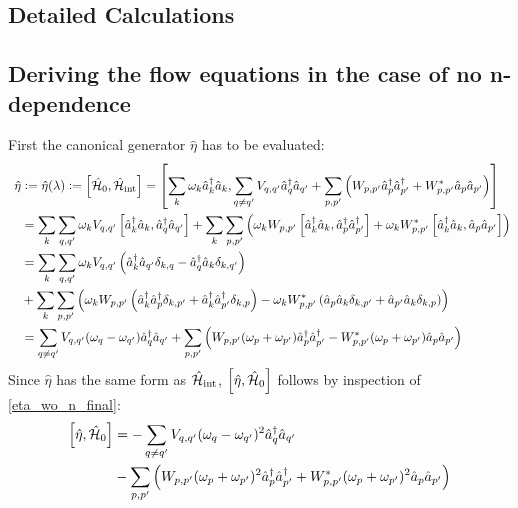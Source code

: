 \begin{appendix}

\chapter{Detailed Calculations}\label{Detailed Calculations}
\thispagestyle{empty}

\section{Deriving the flow equations in the case of no n-dependence}\label{Deriving the flow equations in the case of no n-dependence}
First the canonical generator $\hat\eta$ has to be evaluated:
\begin{align}
\hat\eta&\vcentcolon=\hat\eta(\lambda)\vcentcolon=\left[\hat{\mathcal{H}}_0,\hat{\mathcal{H}}_{\mathrm{int}}\right] = \left[\sum\limits_k \omega_k \hat a^\dagger_k\hat a_k,\sum\limits_{q\neq q^\prime}V_{q,q^\prime}\hat a^\dagger_q\hat a_{q^\prime}+\sum\limits_{p,p^\prime}\left(W_{p,p^\prime}\hat a^\dagger_p\hat a^\dagger_{p^\prime}+W_{p,p^\prime}^*\hat a_p\hat a_{p^\prime}\right)\right]  \\ \quad& 
= \sum\limits_k\sum\limits_{q,q^\prime}\omega_kV_{q,q^\prime}\left[\hat a^\dagger_k\hat a_k,\hat a^\dagger_q\hat a_{q^\prime}\right]+\sum\limits_k\sum\limits_{p,p^\prime}\left(\omega_k W_{p,p^\prime}\left[\hat a^\dagger_k\hat a_k,\hat a^\dagger_p\hat a^\dagger_{p^\prime}\right]+\omega_k W_{p,p^\prime}^*\left[\hat a^\dagger_k\hat a_k,\hat a_p\hat a_{p^\prime}\right]\right) \nonumber \\ \quad& 
=\sum\limits_k\sum\limits_{q,q^\prime}\omega_kV_{q,q^\prime}\left(\hat a^\dagger_k\hat a_{q^\prime}\delta_{k,q}-\hat a^\dagger_q\hat a_k\delta_{k,q^\prime}\right) \nonumber \\ \quad& +\sum\limits_k\sum\limits_{p,p^\prime}\left(\omega_k W_{p,p^\prime}\left(\hat a^\dagger_k\hat a^\dagger_p\delta_{k,p^\prime}+\hat a^\dagger_k\hat a^\dagger_{p^\prime}\delta_{k,p}\right)-\omega_k W_{p,p^\prime}^*\left(\hat a_p\hat a_k\delta_{k,p^\prime}+\hat a_{p^\prime}\hat a_k\delta_{k,p}\right)\right) \nonumber \\ \quad& = \sum\limits_{q\neq q^\prime}V_{q,q^\prime}(\omega_q-\omega_{q^\prime})\hat a^\dagger_q\hat a_{q^\prime}+\sum\limits_{p,p^\prime}\left(W_{p,p^\prime}(\omega_p+\omega_{p^\prime})\hat a^\dagger_p\hat a^\dagger_{p^\prime}-W_{p,p^\prime}^*(\omega_p+\omega_{p^\prime})\hat a_p\hat a_{p^\prime}\right) \label{eta_wo_n_final}
\end{align}
Since $\hat\eta$ has the same form as $\hat{\mathcal{H}}_{\mathrm{int}}$, $\left[\hat\eta,\hat{\mathcal{H}}_0\right]$ follows by inspection of \ref{eta_wo_n_final}:
\begin{align}
\left[\hat\eta,\ham_0\right]&=-\Sum_{q\neq q^\prime}V_{q,q^\prime}(\omega_q-\omega_{q^\prime})^2\CR_q\AN_{q^\prime}\nonumber \\ \quad& -\Sum_{p,p^\prime}\left(W_{p,p^\prime}(\omega_p+\omega_{p^\prime})^2\CR_p\CR_{p^\prime}+W_{p,p^\prime}^*(\omega_p+\omega_{p^\prime})^2\AN_p\AN_{p^\prime}\right) 

\end{align}
\end{appendix}
